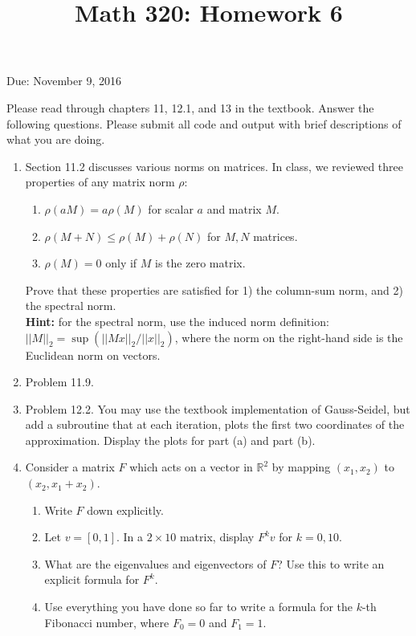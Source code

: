 \documentclass[12pt]{amsart}
\newcommand{\RR}{\mathbb{R}}
\begin{document}
\title{Math 320: Homework 6}
Due: November 9, 2016
\maketitle

Please read through chapters 11, 12.1, and 13 in the textbook.
Answer the following questions. Please submit all code
and output with brief descriptions of what you are doing.

\vspace{5mm}

\begin{enumerate}

\item Section 11.2 discusses various norms on matrices.
In class, we reviewed three properties of any matrix norm $\rho$:
\begin{enumerate}
\item $\rho(a M) = a \rho(M)$ for scalar $a$ and matrix $M$.
\item $\rho( M + N) \leq \rho(M) + \rho(N)$ for $M,N$ matrices.
\item $\rho(M) = 0$ only if $M$ is the zero matrix.
\end{enumerate}
Prove that these properties are satisfied for 1) the column-sum
norm, and 2) the spectral norm. \\ 
{\bf Hint:} for the spectral norm,
use the induced norm definition: 
$||M||_2 = \sup(||Mx||_2 /||x||_2)$, where the
norm on the right-hand side is the Euclidean norm on vectors.

\vspace{5mm}

\item Problem 11.9.

\vspace{5mm}

\item Problem 12.2. You may use the textbook implementation of
Gauss-Seidel, but add a subroutine that at each iteration, plots the
first two coordinates of the approximation.
Display the plots for part (a) and part (b).

\vspace{5mm}

\item Consider a matrix $F$ which acts on a vector in
$\RR^2$ by mapping $(x_1,x_2)$ to $(x_2, x_1 + x_2)$.

\begin{enumerate}
\item Write $F$ down explicitly.
\item Let $v = [0,1]$. In a $2 \times 10$ matrix, 
display $F^kv$ for $k = 0, 10$.
\item What are the eigenvalues and eigenvectors of $F$?
Use this to write an explicit formula for $F^k$.
\item Use everything you have done so far to write a formula
for the $k$-th Fibonacci number, where $F_0 = 0$ and $F_1 = 1$.
\end{enumerate}
\end{enumerate}
\end{document}
